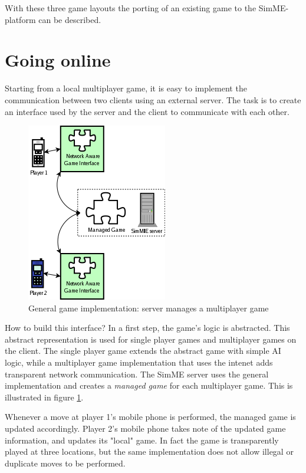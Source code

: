 	With these three game layouts the porting of an existing game to the
	SimME-platform can be described.


\section{Going online} \label{sec:going_online}

	Starting from a local multiplayer game, it is easy to implement the
	communication between two clients using an external server. The task is to
	create an interface used by the server and the client to communicate with
	each other.

	\begin{figure}[h]
	\begin{center}
		\includegraphics{pics/interface-usage.png}
		\caption{General game implementation: server manages a multiplayer game}
		\label{fig:interface}
	\end{center}
	\end{figure}

	How to build this interface? In a first step, the game's logic is
	abstracted. This abstract representation is used for single player games and
	multiplayer games on the client. The single player game extends the abstract
	game with simple AI logic, while a multiplayer game implementation that uses
	the intenet adds transparent network communication. The SimME server uses
	the general implementation and creates a \emph{managed game} for each
	multiplayer game. This is illustrated in figure \ref{fig:interface}.

	Whenever a move at player 1's mobile phone is performed, the managed game is
	updated accordingly. Player 2's mobile phone takes note of the updated game
	information, and updates its "local" game. In fact the game is transparently
	played at three locations, but the same implementation does not allow
	illegal or duplicate moves to be performed.


